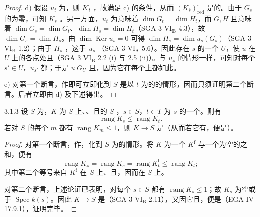\begin{proof}
 d) 假设 $u_t$ 为，则 $K_t$ ，故满足 c) 的条件，从而 $(K_{\bar s})^\circ_{\mathrm{red}}$ 是的。由于 $G_s$ 的为零，可知 $K_s$ 。另一方面，$u_t$ 为意味着 $\dim G_t=\dim H_t$，而 $G,H$ 且意味着 $\dim G_s=\dim G_t$、$\dim H_s=\dim H_t$（SGA 3 VI$_{\mathrm B}$ 4.3），故 $\dim G_s=\dim H_s$。由 $\dim\operatorname{Ker}u_s=0$ 可得 $\dim H_s=\dim u_s(G_s)$（SGA 3 VI$_{\mathrm B}$ 1.2）；由于 $H_s$ ，这于 $u_s$ （SGA 3 VI$_{\mathrm A}$ 5.6）。因此存在 $s$ 的一个 $U$，使 $u$ 在 $U$ 上的各点处且（SGA 3 VI$_{\mathrm B}$ 2.2 (i) 与 2.5 (ii)）。与 $u_s$ 的情形一样，可知对每个 $s'\in U$，$u_{s'}$ 都；于是 $u|G_U$ 且，因为它在每个上都如此。

 e) 对第一个断言，作即可立即化到 $S$ 是以 $t$ 为的的情形，因而只须证明第二个断言。后者立即由 d) 及下述得出。
\end{proof}
\begin{SGAresult}{}{3.1.3}
设 $S$ 为，$K$ 为 $S$ 上、、且的 $S$-，$s\in S$，$t\in T$ 为 $s$ 的一个。则有
\[
 \operatorname{rang}K_s\leq\operatorname{rang}K_t.
\]
若对 $S$ 的每个 $m$ 都有 $\operatorname{rang}K_m\leq1$，则 $K\to S$ 是（从而若它有，便是）。
\end{SGAresult}
\begin{proof}
对第一个断言，作，化到 $S$ 为的情形。将 $K$ 为一个 $K^{\mathrm f}$ 与一个为空的之和，便有
\[
 \operatorname{rang}K_s=\operatorname{rang}K_s^{\mathrm f}
 =\operatorname{rang}K_t^{\mathrm f}\leq\operatorname{rang}K_t;
\]
其中第二个等号来自 $K^{\mathrm f}$ 在 $S$ 上、且，因而在 $S$ 上。

对第二个断言，上述论证已表明，对每个 $s\in S$ 都有 $\operatorname{rang}K_s\leq1$；故 $K_s$ 为空或于 $\operatorname{Spec}k(s)$。因此 $K\to S$ 是（SGA 3 VI$_{\mathrm B}$ 2.11），又因它且，便是（EGA IV 17.9.1），证明完毕。
\end{proof}
